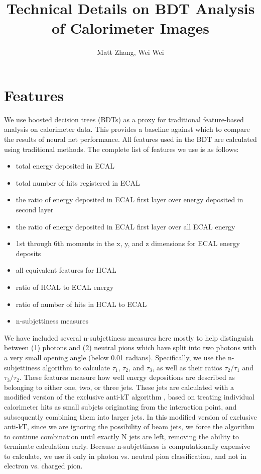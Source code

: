 \documentclass{article}
\begin{document}
    \title{Technical Details on BDT Analysis of Calorimeter Images}
    \author{Matt Zhang, Wei Wei}
    \date{}
    \maketitle

    \section*{Features}

    We use boosted decision trees (BDTs) as a proxy for traditional feature-based analysis on calorimeter data. This provides a baseline against which to compare the results of neural net performance. All features used in the BDT are calculated using traditional methods. The complete list of features we use is as follows:

    \begin{itemize}
        \item total energy deposited in ECAL
        \item total number of hits registered in ECAL
        \item the ratio of energy deposited in ECAL first layer over energy deposited in second layer
        \item the ratio of energy deposited in ECAL first layer over all ECAL energy
        \item 1st through 6th moments in the x, y, and z dimensions for ECAL energy deposits
        \item all equivalent features for HCAL
        \item ratio of HCAL to ECAL energy
        \item ratio of number of hits in HCAL to ECAL
        \item n-subjettiness measures
    \end{itemize}

    We have included several n-subjettiness measures here mostly to help distinguish between (1) photons and (2) neutral pions which have split into two photons with a very small opening angle (below 0.01 radians). Specifically, we use the n-subjettiness algorithm \cite{nsub} to calculate $\tau_1$, $\tau_2$, and $\tau_3$, as well as their ratios $\tau_2/\tau_1$ and $\tau_3/\tau_2$. These features measure how well energy depositions are described as belonging to either one, two, or three jets. These jets are calculated with a modified version of the exclusive anti-kT algorithm \cite{anti-kt}, based on treating individual calorimeter hits as small subjets originating from the interaction point, and subsequently combining them into larger jets. In this modified version of exclusive anti-kT, since we are ignoring the possibility of beam jets, we force the algorithm to continue combination until exactly N jets are left, removing the ability to terminate calculation early. Because n-subjettiness is computationally expensive to calculate, we use it only in photon vs. neutral pion classification, and not in electron vs. charged pion.
\end{document}
